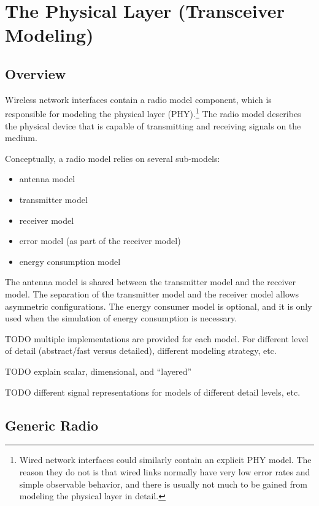\chapter{The Physical Layer (Transceiver Modeling)}
\label{cha:physicallayer}

\section{Overview}

Wireless network interfaces contain a radio model component, which is
responsible for modeling the physical layer (PHY).\footnote{Wired network interfaces
could similarly contain an explicit PHY model. The reason they do not is that
wired links normally have very low error rates and simple observable behavior,
and there is usually not much to be gained from modeling the physical layer in detail.}
The radio model describes the physical device that is capable of transmitting
and receiving signals on the medium. 

Conceptually, a radio model relies on several sub-models:

\begin{itemize}
  \item antenna model
  \item transmitter model 
  \item receiver model 
  \item error model (as part of the receiver model)
  \item energy consumption model 
\end{itemize}

The antenna model is shared between the transmitter model and the receiver model.
The separation of the transmitter model and the receiver model allows 
asymmetric configurations. The energy consumer model is optional, and 
it is only used when the simulation of energy consumption is necessary.

TODO multiple implementations are provided for each model. For different
level of detail (abstract/fast versus detailed), different modeling strategy, etc.

TODO explain scalar, dimensional, and ``layered''

TODO different signal representations for models of different detail levels, etc.

\section{Generic Radio}

